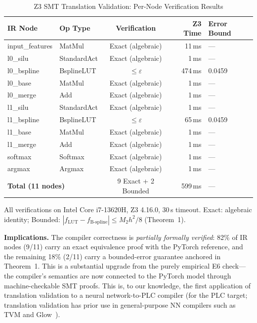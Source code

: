 \documentclass[journal,onecolumn]{IEEEtran}
\begin{document}
\begin{table}[t]
    \centering
    \caption{Z3 SMT Translation Validation: Per-Node Verification Results}
    \label{tab:z3_smt}
    \footnotesize
    \begin{tabular}{@{}llcrl@{}}
        \toprule
        \textbf{IR Node} & \textbf{Op Type} & \textbf{Verification} & \textbf{Z3 Time} & \textbf{Error Bound} \\
        \midrule
       input\_features & MatMul      & Exact (algebraic)  & 11\,ms  & --- \\
       l0\_silu       & StandardAct & Exact (algebraic)  & 1\,ms   & --- \\
       l0\_bspline    & BsplineLUT  & $\leq\varepsilon$  & 474\,ms & 0.0459 \\
       l0\_base       & MatMul      & Exact (algebraic)  & 1\,ms   & --- \\
       l0\_merge      & Add         & Exact (algebraic)  & 1\,ms   & --- \\
       l1\_silu       & StandardAct & Exact (algebraic)  & 1\,ms   & --- \\
       l1\_bspline    & BsplineLUT  & $\leq\varepsilon$  & 65\,ms  & 0.0459 \\
       l1\_base       & MatMul      & Exact (algebraic)  & 1\,ms   & --- \\
       l1\_merge      & Add         & Exact (algebraic)  & 1\,ms   & --- \\
       softmax        & Softmax     & Exact (algebraic)  & 1\,ms   & --- \\
       argmax         & Argmax      & Exact (algebraic)  & 1\,ms   & --- \\
        \midrule
        \multicolumn{2}{l}{\textbf{Total (11 nodes)}} & 9 Exact + 2 Bounded & 599\,ms & --- \\
        \bottomrule
    \end{tabular}
    \vspace{2pt}
    {\scriptsize All verifications on Intel Core i7-13620H, Z3 4.16.0, 30\,s timeout.
    Exact: algebraic identity; Bounded: $|f_{\text{LUT}} - f_{\text{B-spline}}| \leq M_2 h^2/8$ (Theorem~1).}
\end{table}

\noindent\textbf{Implications.} The compiler correctness is \emph{partially
formally verified}: 82\% of IR nodes (9/11) carry an exact equivalence proof
with the PyTorch reference, and the remaining 18\% (2/11) carry a bounded-error
guarantee anchored in Theorem~1. This is a substantial upgrade from the purely
empirical E6 check---the compiler's semantics are now connected to the PyTorch
model through machine-checkable SMT proofs.
This is, to our knowledge, the first application
of translation validation to a neural network-to-PLC compiler
(for the PLC target; translation validation has prior use in general-purpose
NN compilers such as TVM and Glow~\cite{chen2018tvm,roth2018glow}).
\end{document}
